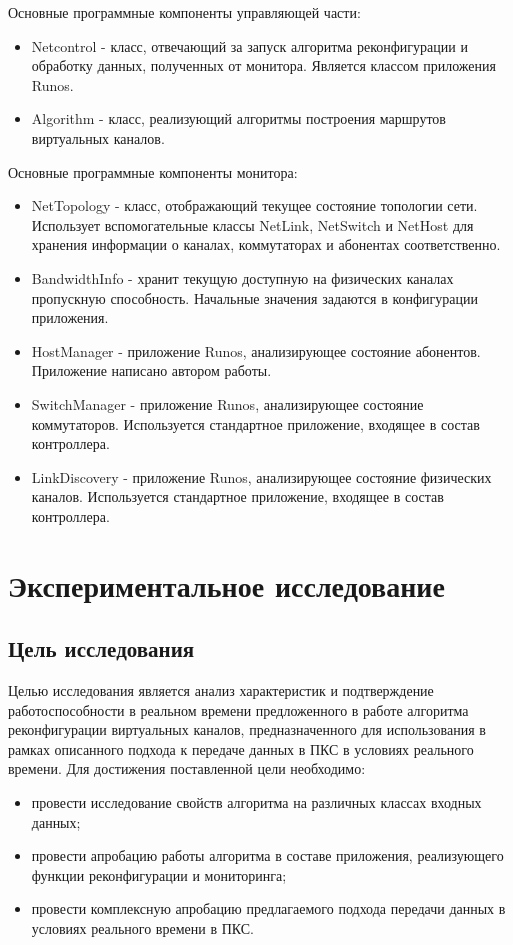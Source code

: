 \documentclass[12pt, a4paper]{article}
\begin{document}
Основные программные компоненты управляющей части:
\begin{itemize}
	\item Netcontrol - класс, отвечающий за запуск алгоритма реконфигурации и обработку данных, полученных от монитора. Является классом приложения Runos.
	\item Algorithm - класс, реализующий алгоритмы построения маршрутов виртуальных каналов.
\end{itemize}

Основные программные компоненты монитора:
\begin{itemize}
	\item NetTopology - класс, отображающий текущее состояние топологии сети. Использует вспомогательные классы NetLink, NetSwitch и NetHost для хранения информации о каналах, коммутаторах и абонентах соответственно.
	\item BandwidthInfo - хранит текущую доступную на физических каналах пропускную способность. Начальные значения задаются в конфигурации приложения.
	\item HostManager - приложение Runos, анализирующее состояние абонентов. Приложение написано автором работы.
	\item SwitchManager - приложение Runos, анализирующее состояние коммутаторов. Используется стандартное приложение, входящее в состав контроллера.
	\item LinkDiscovery - приложение Runos, анализирующее состояние физических каналов. Используется стандартное приложение, входящее в состав контроллера.
\end{itemize}


\section{Экспериментальное исследование}
\subsection{Цель исследования}
Целью исследования является анализ характеристик и подтверждение работоспособности в реальном времени предложенного в работе алгоритма реконфигурации виртуальных каналов, предназначенного для использования в рамках описанного подхода к передаче данных в ПКС в условиях реального времени. Для достижения поставленной цели необходимо:
\begin{itemize}
	\item провести исследование свойств алгоритма на различных классах входных данных; 
	\item провести апробацию работы алгоритма в составе приложения, реализующего функции реконфигурации и мониторинга;
	\item провести комплексную апробацию предлагаемого подхода передачи данных в условиях реального времени в ПКС.
\end{itemize}
\end{document}

